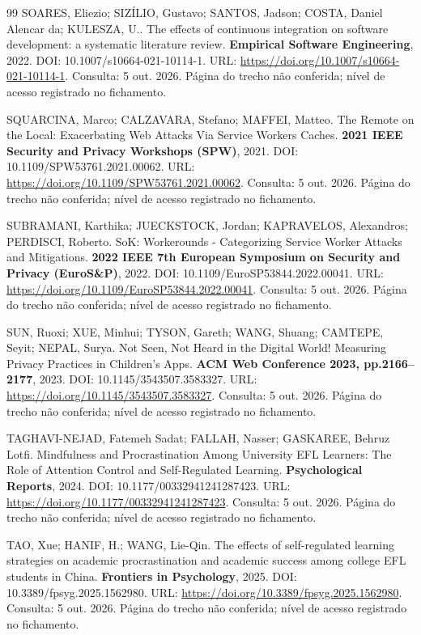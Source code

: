 \begin{thebibliography}{99}
 SOARES, Eliezio; SIZÍLIO, Gustavo; SANTOS, Jadson; COSTA, Daniel Alencar da; KULESZA, U.. The effects of continuous integration on software development: a systematic literature review. \textbf{Empirical Software Engineering}, 2022. DOI: 10.1007/s10664-021-10114-1. URL: \url{https://doi.org/10.1007/s10664-021-10114-1}. Consulta: 5 out. 2026. Página do trecho não conferida; nível de acesso registrado no fichamento.

 SQUARCINA, Marco; CALZAVARA, Stefano; MAFFEI, Matteo. The Remote on the Local: Exacerbating Web Attacks Via Service Workers Caches. \textbf{2021 IEEE Security and Privacy Workshops (SPW)}, 2021. DOI: 10.1109/SPW53761.2021.00062. URL: \url{https://doi.org/10.1109/SPW53761.2021.00062}. Consulta: 5 out. 2026. Página do trecho não conferida; nível de acesso registrado no fichamento.

 SUBRAMANI, Karthika; JUECKSTOCK, Jordan; KAPRAVELOS, Alexandros; PERDISCI, Roberto. SoK: Workerounds - Categorizing Service Worker Attacks and Mitigations. \textbf{2022 IEEE 7th European Symposium on Security and Privacy (EuroS\&P)}, 2022. DOI: 10.1109/EuroSP53844.2022.00041. URL: \url{https://doi.org/10.1109/EuroSP53844.2022.00041}. Consulta: 5 out. 2026. Página do trecho não conferida; nível de acesso registrado no fichamento.

 SUN, Ruoxi; XUE, Minhui; TYSON, Gareth; WANG, Shuang; CAMTEPE, Seyit; NEPAL, Surya. Not Seen, Not Heard in the Digital World! Measuring Privacy Practices in Children’s Apps. \textbf{ACM Web Conference 2023, pp.2166–2177}, 2023. DOI: 10.1145/3543507.3583327. URL: \url{https://doi.org/10.1145/3543507.3583327}. Consulta: 5 out. 2026. Página do trecho não conferida; nível de acesso registrado no fichamento.

 TAGHAVI-NEJAD, Fatemeh Sadat; FALLAH, Nasser; GASKAREE, Behruz Lotfi. Mindfulness and Procrastination Among University EFL Learners: The Role of Attention Control and Self-Regulated Learning. \textbf{Psychological Reports}, 2024. DOI: 10.1177/00332941241287423. URL: \url{https://doi.org/10.1177/00332941241287423}. Consulta: 5 out. 2026. Página do trecho não conferida; nível de acesso registrado no fichamento.

 TAO, Xue; HANIF, H.; WANG, Lie-Qin. The effects of self-regulated learning strategies on academic procrastination and academic success among college EFL students in China. \textbf{Frontiers in Psychology}, 2025. DOI: 10.3389/fpsyg.2025.1562980. URL: \url{https://doi.org/10.3389/fpsyg.2025.1562980}. Consulta: 5 out. 2026. Página do trecho não conferida; nível de acesso registrado no fichamento.


\end{thebibliography}

